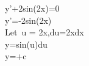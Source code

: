 y'+2sin(2\pi x)=0\\
\int y'=-\int 2sin(2\pi x) \\
Let\ u = 2\pi x,du=2\pi xdx\\
y=\int sin(u)du \\
y=+c